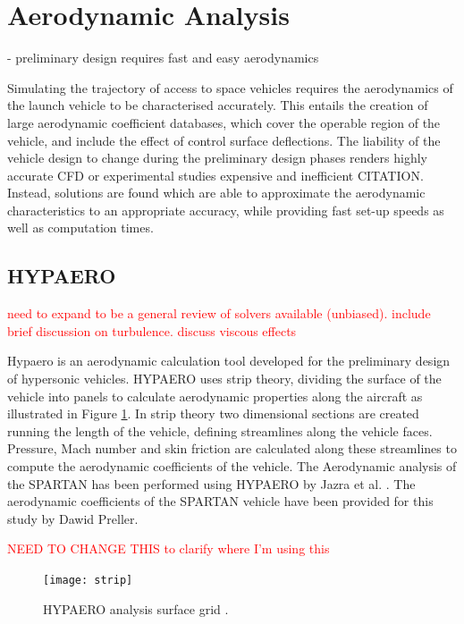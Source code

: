 \section{Aerodynamic Analysis}
- preliminary design requires fast and easy aerodynamics 

Simulating the trajectory of access to space vehicles requires the aerodynamics of the launch vehicle to be characterised accurately. This entails the creation of large aerodynamic coefficient databases, which cover the operable region of the vehicle, and include the effect of control surface deflections. The liability of the vehicle design to change during the preliminary design phases renders highly accurate CFD or experimental studies expensive and inefficient CITATION. Instead, solutions are found which are able to approximate the aerodynamic characteristics to an appropriate accuracy, while providing fast set-up speeds as well as computation times. 

\subsection{HYPAERO}
\textcolor{red}{need to expand to be a general review of solvers available (unbiased). include brief discussion on turbulence. discuss viscous effects}


Hypaero is an aerodynamic calculation tool developed for the preliminary design of hypersonic vehicles. 
HYPAERO uses strip theory, dividing the surface of the vehicle into panels to calculate aerodynamic properties along the aircraft as illustrated in Figure \ref{fig:strip}. In strip theory two dimensional sections are created running the length of the vehicle, defining streamlines along the vehicle faces. Pressure, Mach number and skin friction are calculated along these streamlines to compute the aerodynamic coefficients of the vehicle. The Aerodynamic analysis of the SPARTAN has been performed using HYPAERO by Jazra et al. \cite{Jazra2013}. The aerodynamic coefficients of the SPARTAN vehicle have been provided for this study by Dawid Preller.

\textcolor{red}{NEED TO CHANGE THIS to clarify where I'm using this}

\begin{figure}[ht]
	\centering
	\texttt{[image: strip]}
	\caption{HYPAERO analysis surface grid \cite{Jazra2013}.}
	\label{fig:strip}
\end{figure}

